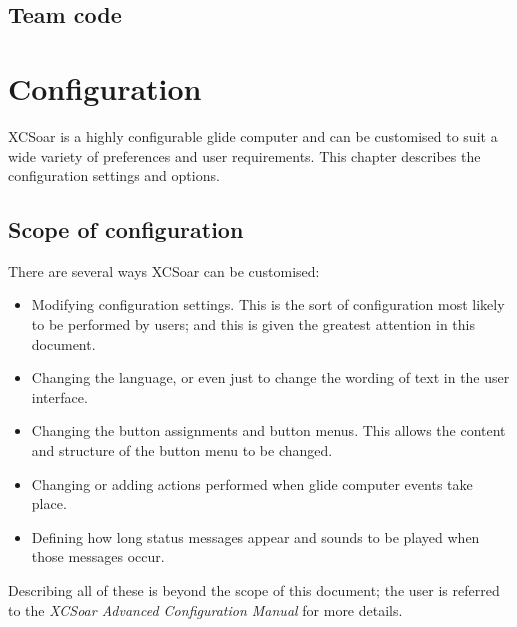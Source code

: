 \documentclass[a4paper,12pt]{refrep}
\begin{document}
\section{Team code}



\chapter{Configuration}\label{cha:configuration}
XCSoar is a highly configurable glide computer and can be customised
to suit a wide variety of preferences and user requirements.  This
chapter describes the configuration settings and options.

\section{Scope of configuration}

There are several ways XCSoar can be customised:
\begin{itemize}

\item Modifying configuration settings.  This is the sort of configuration
 most likely to be performed by users; and this is given the greatest attention in this document.
\item Changing the language, or even just to change the wording
  of text in the user interface.
\item Changing the button assignments and button menus.  This allows 
the content and structure of the button menu to be changed. 
\item Changing or adding actions performed when glide computer events
 take place.
\item Defining how long status messages appear and sounds to be played
 when those messages occur.
\end{itemize}
Describing all of these is beyond the scope of this document;
the user is referred to the {\em XCSoar Advanced Configuration Manual} 
for more details.
\end{document}
